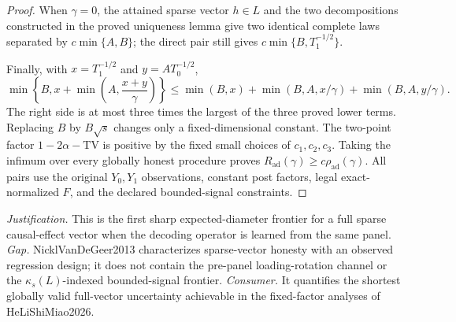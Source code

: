 \documentclass{article}
\begin{document}
\begin{proof}
When \(\gamma=0\), the attained sparse vector \(h\in L\) and the two decompositions constructed in the proved uniqueness lemma give two identical complete laws separated by \(c\min\{A,B\}\); the direct pair still gives \(c\min\{B,T_1^{-1/2}\}\).

Finally, with \(x=T_1^{-1/2}\) and \(y=AT_0^{-1/2}\),
\[
 \min\left\{B,x+\min\left(A,\frac{x+y}{\gamma}\right)\right\}
 \le \min(B,x)+\min(B,A,x/\gamma)+\min(B,A,y/\gamma).
\]
The right side is at most three times the largest of the three proved lower terms.  Replacing \(B\) by \(B\sqrt s\) changes only a fixed-dimensional constant.  The two-point factor \(1-2\alpha-\mathrm{TV}\) is positive by the fixed small choices of \(c_1,c_2,c_3\).  Taking the infimum over every globally honest procedure proves \(R_{\mathrm{ad}}(\gamma)\ge c\rho_{\mathrm{ad}}(\gamma)\).  All pairs use the original \(Y_0,Y_1\) observations, constant post factors, legal exact-normalized \(F\), and the declared bounded-signal constraints.
\end{proof}
\par\smallskip\noindent \textit{Justification.} This is the first sharp expected-diameter frontier for a full sparse causal-effect vector when the decoding operator is learned from the same panel. \textit{Gap.} NicklVanDeGeer2013 characterizes sparse-vector honesty with an observed regression design; it does not contain the pre-panel loading-rotation channel or the \(\kappa_s(L)\)-indexed bounded-signal frontier. \textit{Consumer.} It quantifies the shortest globally valid full-vector uncertainty achievable in the fixed-factor analyses of HeLiShiMiao2026.
\end{document}
